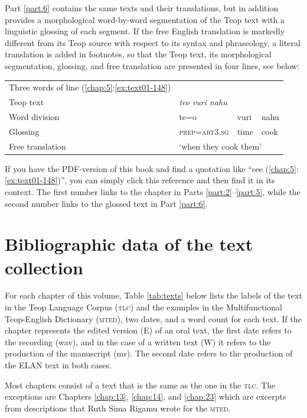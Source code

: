 \documentclass[output=paper]{langscibook}
\begin{document}
Part \ref{part:6} contains the same texts and their translations, but in addition provides a morphological word-by-word segmentation of the Teop text with a linguistic glossing of each segment. If the free English translation is markedly different from its Teop source with respect to its syntax and phraseology, a literal translation is added in footnotes, so that the Teop text, its morphological segmentation, glossing, and free translation are presented in four lines, see below:

\medskip

\begin{tabular}{llll}
    Three words of line (\ref{chap:5}:\ref{ex:text01-148})&&&\\
    Teop text & \multicolumn{3}{l}{\textit{teo vuri nahu}}\\
    Word division & te=o & vuri & nahu\\
    Glossing & \textsc{prep}=\textsc{art}3.\textsc{sg} & time & cook\\
    Free translation & \multicolumn{3}{l}{`when they cook them'\footnotemark}\\
\end{tabular}

\medskip

If you have the PDF-version of this book and find a quotation like ``see (\ref{chap:5}:\ref{ex:text01-148})'', you can simply click this reference and then find it in its context. The first number links to the chapter in Parts \ref{part:2}--\ref{part:5}, while the second number links to the glossed text in Part \ref{part:6}.
\section{Bibliographic data of the text collection}
For each chapter of this volume, Table \ref{tab:texts} below lists the labels of the text in the Teop Language Corpus (\textsc{tlc}) and the examples in the Multifunctional Teop-English Dictionary (\textsc{mted}), two dates, and a word count for each text. If the chapter represents the edited version (E) of an oral text, the first date refers to the recording (wav), and in the case of a written text (W) it refers to the production of the manuscript (ms). The second date refers to the production of the ELAN text in both cases.

Most chapters consist of a text that is the same as the one in the \textsc{tlc}. The exceptions are Chapters \ref{chap:13}, \ref{chap:14}, and \ref{chap:23} which are excerpts from descriptions that Ruth Sima Rigamu wrote for the \textsc{mted}.
\end{document}
